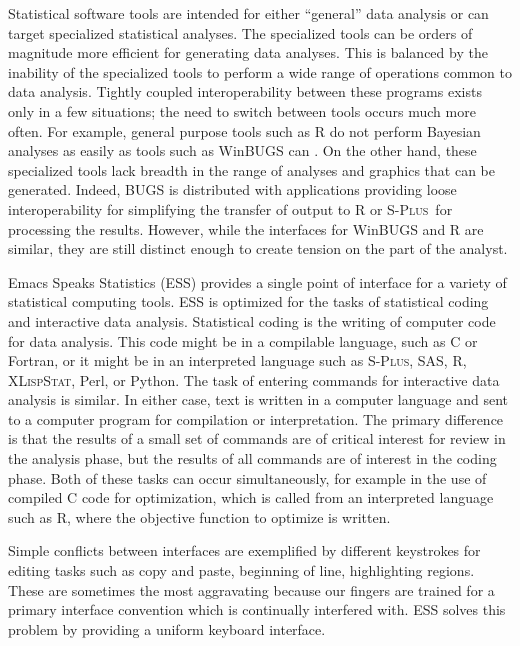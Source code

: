 \documentclass{article}
\newcommand*{\Splus}{\textsc{S-Plus}}
\newcommand*{\XLispStat}{\textsc{XLispStat}}
\begin{document}
Statistical software tools are intended for either ``general'' data
analysis or can target specialized statistical analyses.  The
specialized tools can be orders of magnitude more efficient for
generating data analyses.  This is balanced by the inability of the
specialized tools to perform a wide range of operations common to data
analysis.  Tightly coupled interoperability between these programs
exists only in a few situations; the need to switch between tools
occurs much more often.  For example, general purpose tools such as R
\citep{ihak:gent:1996} do not perform Bayesian analyses as easily as
tools such as WinBUGS can \citep{SpieThomBest:1999}.  On the other
hand, these specialized tools lack breadth in the range of analyses
and graphics that can be generated.  Indeed, BUGS is distributed with
applications providing loose interoperability for simplifying the
transfer of output to R or \Splus\ for processing the results.
However, while the interfaces for WinBUGS and R are similar, they are
still distinct enough to create tension on the part of the analyst.

Emacs Speaks Statistics (ESS) provides a single point of interface for
a variety of statistical computing tools.  ESS is optimized for the
tasks of statistical coding and interactive data analysis.
Statistical coding is the writing of computer code for data analysis.
This code might be in a compilable language, such as C or Fortran, or
it might be in an interpreted language such as \Splus, SAS, R,
\XLispStat, Perl, or Python.  The task of entering commands for
interactive data analysis is similar.  In either case, text is written
in a computer language and sent to a computer program for compilation
or interpretation.  The primary difference is that the results of a
small set of commands are of critical interest for review in the
analysis phase, but the results of all commands are of interest in the
coding phase.  Both of these tasks can occur simultaneously, for
example in the use of compiled C code for optimization, which is
called from an interpreted language such as R, where the objective
function to optimize is written.

Simple conflicts between interfaces are exemplified by different
keystrokes for editing tasks such as copy and paste, beginning of
line, highlighting regions.  These are sometimes the most aggravating
because our fingers are trained for a primary interface convention
which is continually interfered with.  ESS solves this problem by
providing a uniform keyboard interface.
\end{document}
